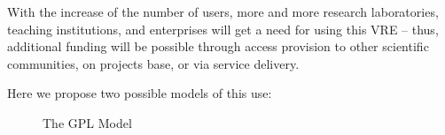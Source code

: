 With the increase of the number of users, more and more research
laboratories, teaching institutions, and enterprises will get a need
for using this VRE – thus, additional funding will be possible through
access provision to other scientific communities, on projects base, or
via service delivery.


Here we propose two possible models of this use:

\begin{figure}[ht]\centering
 \caption{The GPL Model}\label{fig:gpl-model}
\end{figure}

